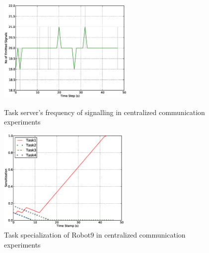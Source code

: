 \documentclass{llncs}
\begin{document}
\begin{figure}
\begin{minipage}[t]{0.5\linewidth}
\centering
\includegraphics[height=5cm, angle=0]
{images/global/Global-SignalingFreqStat.eps}
\caption{\small Task server's frequency of signalling in centralized communication experiments}
\label{fig:signal-frequency-stat} %
\end{minipage}
\hspace{0.5cm}
\begin{minipage}[t]{0.5\linewidth}
\centering
\includegraphics[height=5cm, angle=0]{images/global/PlotRobot9-Sensitizations-2010Feb18-121037.eps}
\caption{\small Task specialization of Robot9 in centralized communication experiments}
\label{fig:single-robot-sensitizations} %
\end{minipage}
\end{figure}
%
%
\end{document}
